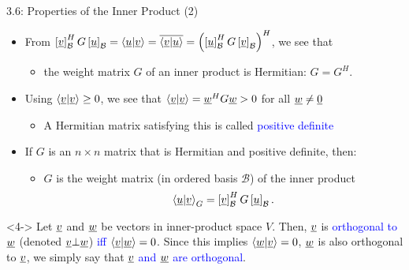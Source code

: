 \documentclass[10pt,letterpaper,english]{beamer}
\begin{document}
\begin{frame}{3.6: Properties of the Inner Product (2)}

\begin{itemize}
\item<1-> From $\left[ \underline{v} \right]_{\mathcal{B}}^H G \left[ \underline{u} \right]_{\mathcal{B}} = \left\langle \underline{u} | \underline{v} \right\rangle
= \overline{ \left\langle \underline{v} | \underline{u} \right\rangle } = \left( \left[ \underline{u} \right]_{\mathcal{B}}^H G \left[ \underline{v} \right]_{\mathcal{B}} \right)^H$, we see that

\begin{itemize}
\item the weight matrix $G$ of an inner product is Hermitian: $G = G^H$.
\end{itemize}

\vspace{1mm}
\item<2-> Using $\left\langle \underline{v} | \underline{v} \right\rangle \geq 0$, we see that $\left\langle \underline{v} | \underline{v} \right\rangle = \underline{w}^H G \underline{w} > 0$ for all $\underline{w} \neq \underline{0}$

\begin{itemize}
\item A Hermitian matrix satisfying this is called  \textcolor{blue}{positive definite} 

\end{itemize}

\vspace{1mm}
\item<3-> If $G$ is an $n \times n$ matrix that is Hermitian and positive definite, then:
\begin{itemize}
\item $G$ is the weight matrix (in ordered basis $\mathcal{B}$) of the inner product
\begin{equation*}
\left\langle \underline{u} | \underline{v} \right\rangle_G
= \left[ \underline{v} \right]_{\mathcal{B}}^H G \left[ \underline{u} \right]_{\mathcal{B}}.
\end{equation*}
\end{itemize}

\end{itemize}

\begin{definition}[Orthogonal]<4->
Let $\underline{v}$ and $\underline{w}$ be vectors in inner-product space $V$.
Then, $\underline{v}$ is \textcolor{blue}{orthogonal to $\underline{w}$} (denoted $\underline{v} \bot \underline{w}$) \textcolor{blue}{iff $\left\langle \underline{v} | \underline{w} \right\rangle = 0$}.
Since this implies $\left\langle \underline{w} | \underline{v} \right\rangle = 0$, $\underline{w}$ is also orthogonal to $\underline{v}$, we simply say that \textcolor{blue}{$\underline{v}$ and $\underline{w}$ are orthogonal}.
\end{definition}

\end{frame}
\end{document}
